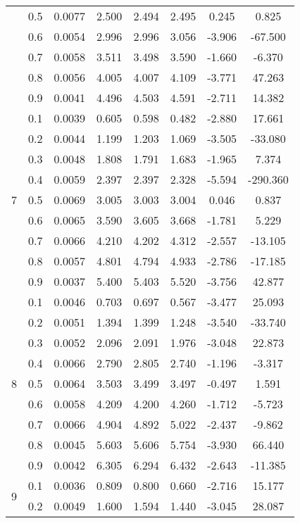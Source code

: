 \documentclass[11pt,a4paper]{report}
\begin{document}
\begin{longtable}{ | c | c || c | c | c | c | c | c | }
 & 0.5 & 0.0077 & 2.500 & 2.494 & 2.495 & 0.245 & 0.825 \\
 & 0.6 & 0.0054 & 2.996 & 2.996 & 3.056 & -3.906 & -67.500 \\
 & 0.7 & 0.0058 & 3.511 & 3.498 & 3.590 & -1.660 & -6.370 \\
 & 0.8 & 0.0056 & 4.005 & 4.007 & 4.109 & -3.771 & 47.263 \\
 & 0.9 & 0.0041 & 4.496 & 4.503 & 4.591 & -2.711 & 14.382 \\
 \hline
\multirow{9}{*}{7} & 0.1 & 0.0039 & 0.605 & 0.598 & 0.482 & -2.880 & 17.661 \\
 & 0.2 & 0.0044 & 1.199 & 1.203 & 1.069 & -3.505 & -33.080 \\
 & 0.3 & 0.0048 & 1.808 & 1.791 & 1.683 & -1.965 & 7.374 \\
 & 0.4 & 0.0059 & 2.397 & 2.397 & 2.328 & -5.594 & -290.360 \\
 & 0.5 & 0.0069 & 3.005 & 3.003 & 3.004 & 0.046 & 0.837 \\
 & 0.6 & 0.0065 & 3.590 & 3.605 & 3.668 & -1.781 & 5.229 \\
 & 0.7 & 0.0066 & 4.210 & 4.202 & 4.312 & -2.557 & -13.105 \\
 & 0.8 & 0.0057 & 4.801 & 4.794 & 4.933 & -2.786 & -17.185 \\
 & 0.9 & 0.0037 & 5.400 & 5.403 & 5.520 & -3.756 & 42.877 \\
 \hline
\multirow{9}{*}{8} & 0.1 & 0.0046 & 0.703 & 0.697 & 0.567 & -3.477 & 25.093 \\
 & 0.2 & 0.0051 & 1.394 & 1.399 & 1.248 & -3.540 & -33.740 \\
 & 0.3 & 0.0052 & 2.096 & 2.091 & 1.976 & -3.048 & 22.873 \\
 & 0.4 & 0.0066 & 2.790 & 2.805 & 2.740 & -1.196 & -3.317 \\
 & 0.5 & 0.0064 & 3.503 & 3.499 & 3.497 & -0.497 & 1.591 \\
 & 0.6 & 0.0058 & 4.209 & 4.200 & 4.260 & -1.712 & -5.723 \\
 & 0.7 & 0.0066 & 4.904 & 4.892 & 5.022 & -2.437 & -9.862 \\
 & 0.8 & 0.0045 & 5.603 & 5.606 & 5.754 & -3.930 & 66.440 \\
 & 0.9 & 0.0042 & 6.305 & 6.294 & 6.432 & -2.643 & -11.385 \\
 \hline
\multirow{9}{*}{9} & 0.1 & 0.0036 & 0.809 & 0.800 & 0.660 & -2.716 & 15.177 \\
 & 0.2 & 0.0049 & 1.600 & 1.594 & 1.440 & -3.045 & 28.087 \\

\end{longtable}
\end{document}

